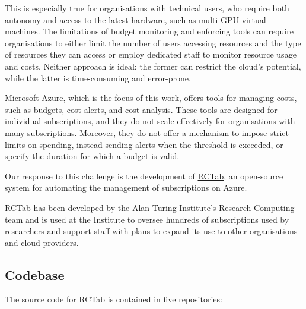 \documentclass[
]{article}
\begin{document}
This is especially true for organisations with technical users, who
require both autonomy and access to the latest hardware, such as
multi-GPU virtual machines. The limitations of budget monitoring and
enforcing tools can require organisations to either limit the number of
users accessing resources and the type of resources they can access or
employ dedicated staff to monitor resource usage and costs. Neither
approach is ideal: the former can restrict the cloud's potential, while
the latter is time-consuming and error-prone.

Microsoft Azure, which is the focus of this work, offers tools for
managing costs, such as budgets, cost alerts, and cost analysis\cite{azurecm}.
These tools are designed for individual subscriptions, and
they do not scale effectively for organisations with many subscriptions.
Moreover, they do not offer a mechanism to impose strict limits on
spending, instead sending alerts when the threshold is exceeded, or
specify the duration for which a budget is valid.

Our response to this challenge is the development of
\href{https://rctab.readthedocs.io/}{RCTab}, an open-source system for
automating the management of subscriptions on Azure.

RCTab has been developed by the Alan Turing Institute's Research
Computing team and is used at the Institute to oversee hundreds of
subscriptions used by researchers and support staff with plans to expand
its use to other organisations and cloud providers.

\subsection{Codebase}\label{codebase}

The source code for RCTab is contained in five repositories:
\end{document}

